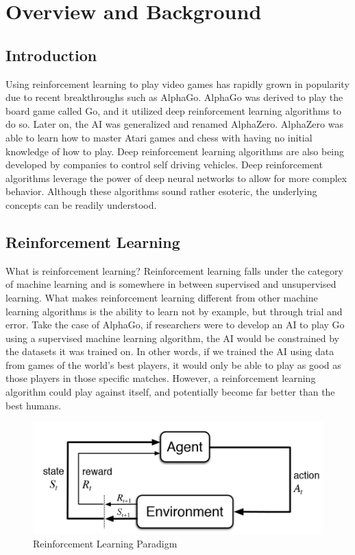 \documentclass[12pt]{article}
\begin{document}
\section*{\Large Overview and Background}

%
%
\subsection*{Introduction}

Using reinforcement learning to play video games has rapidly grown in popularity due to recent breakthroughs such as AlphaGo.  AlphaGo was derived to play the board game called Go, and it utilized deep reinforcement learning algorithms to do so.  Later on, the AI was generalized and renamed AlphaZero. AlphaZero was able to learn how to master Atari games and chess with having no initial knowledge of how to play.  Deep reinforcement learning algorithms are also being developed by companies to control self driving vehicles.  Deep reinforcement algorithms leverage the power of deep neural networks to allow for more complex behavior.  Although these algorithms sound rather esoteric, the underlying concepts can be readily understood.

%
%
\subsection*{Reinforcement Learning}

What is reinforcement learning?  Reinforcement learning falls under the category of machine learning and is somewhere in between supervised and unsupervised learning.  What makes reinforcement learning different from other machine learning algorithms is the ability to learn not by example, but through trial and error.  Take the case of AlphaGo, if researchers were to develop an AI to play Go using a supervised machine learning algorithm, the AI would be constrained by the datasets it was trained on.  In other words, if we trained the AI using data from games of the world’s best players, it would only be able to play as good as those players in those specific matches. However, a reinforcement learning algorithm could play against itself, and potentially become far better than the best humans.

\begin{figure} [!ht]
    \centering
    \includegraphics[width=.6\textwidth, height=0.2\textheight]{reinforce.png}
    \caption{Reinforcement Learning Paradigm \cite{sutton_barto_2018}}
    \label{fig:reinforce}
\end{figure}
\end{document}
